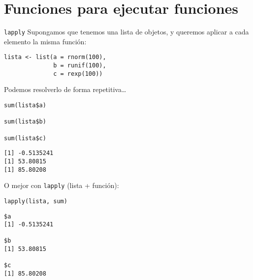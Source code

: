 \documentclass[xcolor={usenames,svgnames,dvipsnames}]{beamer}
\begin{document}
\section{Funciones para ejecutar funciones}
\label{sec:orgbd6f26d}
\begin{frame}[label={sec:org1d182df},fragile]{\texttt{lapply}}
 Supongamos que tenemos una lista de objetos, y queremos aplicar a cada elemento la misma función:
\lstset{language=r,label= ,caption= ,captionpos=b,numbers=none}
\begin{lstlisting}
lista <- list(a = rnorm(100),
              b = runif(100),
              c = rexp(100))
\end{lstlisting}

Podemos resolverlo de forma repetitiva\ldots{}
\lstset{language=r,label= ,caption= ,captionpos=b,numbers=none}
\begin{lstlisting}
sum(lista$a)

sum(lista$b)

sum(lista$c)
\end{lstlisting}

\begin{verbatim}
[1] -0.5135241
[1] 53.80815
[1] 85.80208
\end{verbatim}


O mejor con \texttt{lapply} (lista + función):
\lstset{language=r,label= ,caption= ,captionpos=b,numbers=none}
\begin{lstlisting}
lapply(lista, sum)
\end{lstlisting}

\begin{verbatim}
$a
[1] -0.5135241

$b
[1] 53.80815

$c
[1] 85.80208
\end{verbatim}
\end{frame}
\end{document}
